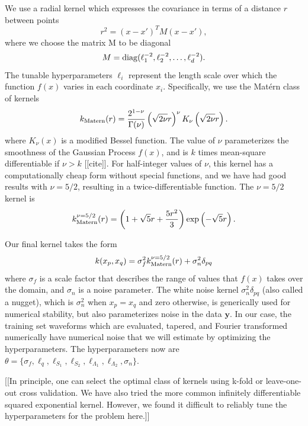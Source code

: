 \documentclass[prd,aps,letter,twocolumn,floatfix,notitlepage,nofootinbib]{revtex4-1}
\begin{document}
We use a radial kernel which expresses the covariance in terms of a distance $r$ between points
\begin{equation}
r^2 = (x-x')^T M (x-x'),
\end{equation}
where we choose the matrix M to be diagonal
\begin{equation}
M = {\rm diag}(\ell_1^{-2}, \ell_2^{-2}, \dots, \ell_d^{-2}).
\end{equation}
The tunable hyperparameters $\ell_i$ represent the length scale over which the function $f(x)$ varies in 
each coordinate $x_i$. Specifically, we use the Mat\'{e}rn class of kernels
\begin{equation}
k_{\rm Matern}(r) = \frac{2^{1-\nu}}{\Gamma(\nu)} \left(\sqrt{2\nu} r\right)^\nu K_\nu \left(\sqrt{2\nu} r \right).
\end{equation}
where $K_\nu(x)$ is a modified Bessel function. The value of $\nu$ parameterizes the smoothness of the 
Gaussian Process $f(x)$, and is $k$ times mean-square differentiable if $\nu>k$ [[cite]]. For half-integer values of $\nu$, this 
kernel has a computationally cheap form without special functions, and we have had good results with $\nu=5/2$, 
resulting in a twice-differentiable function. The $\nu=5/2$ kernel is
\begin{equation}
k_{\rm Matern}^{\nu=5/2}(r) = \left(1+\sqrt{5}r + \frac{5r^2}{3}\right) \exp\left(-\sqrt{5}r\right).
\end{equation}

Our final kernel takes the form
\begin{equation}
k(x_p, x_q) = \sigma_f^2 k_{\rm Matern}^{\nu=5/2}(r) + \sigma_n^2 \delta_{pq}
\end{equation}
where $\sigma_f$ is a scale factor that describes the range of values that $f(x)$ takes over the domain, 
and $\sigma_n$ is a noise parameter. The white noise kernel $\sigma_n^2 \delta_{pq}$ (also called a nugget), which is
$\sigma_n^2$ when $x_p=x_q$ and zero otherwise, is generically used for numerical stability, but also parameterizes
noise in the data ${\bm y}$. In our case, the training set waveforms which are evaluated, tapered, and 
Fourier transformed numerically have numerical noise that we will estimate by optimizing the hyperparameters.
The hyperparameters now are $\theta = \{\sigma_f, \ell_q, \ell_{S_1}, \ell_{S_2}, \ell_{\Lambda_1}, \ell_{\Lambda_2}, \sigma_n\}$.

[[In principle, one can select the optimal class of kernels using k-fold or leave-one-out cross validation. We have also tried the 
more common infinitely differentiable squared exponential kernel. However, we found it difficult to reliably tune the 
hyperparameters for the problem here.]]
\end{document}
